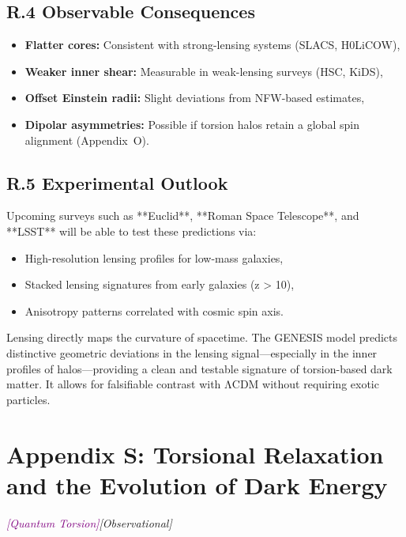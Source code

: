 \documentclass{article}
\newcommand{\quantumtag}{\textcolor{purple}{\textit{[Quantum Torsion]}}}
\newcommand{\obstag}{\textcolor{green!60!black}{\textit{[Observational]}}}
\begin{document}
\subsection*{R.4 Observable Consequences}
\begin{itemize}
  \item \textbf{Flatter cores:} Consistent with strong-lensing systems (SLACS, H0LiCOW),
  \item \textbf{Weaker inner shear:} Measurable in weak-lensing surveys (HSC, KiDS),
  \item \textbf{Offset Einstein radii:} Slight deviations from NFW-based estimates,
  \item \textbf{Dipolar asymmetries:} Possible if torsion halos retain a global spin alignment (Appendix~O).
\end{itemize}

\subsection*{R.5 Experimental Outlook}
Upcoming surveys such as **Euclid**, **Roman Space Telescope**, and **LSST** will be able to test these predictions via:
\begin{itemize}
  \item High-resolution lensing profiles for low-mass galaxies,
  \item Stacked lensing signatures from early galaxies (z > 10),
  \item Anisotropy patterns correlated with cosmic spin axis.
\end{itemize}

\begin{tcolorbox}[colback=gray!5, colframe=black!30, title=Why this matters]
Lensing directly maps the curvature of spacetime. The GENESIS model predicts distinctive geometric deviations in the lensing signal—especially in the inner profiles of halos—providing a clean and testable signature of torsion-based dark matter. It allows for falsifiable contrast with ΛCDM without requiring exotic particles.
\end{tcolorbox}




\section*{Appendix S: Torsional Relaxation and the Evolution of Dark Energy}
\label{app:torsion-relaxation}
\quantumtag  \obstag
\end{document}
